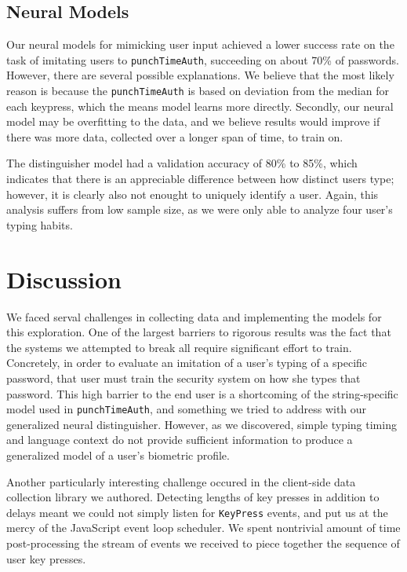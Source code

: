 \documentclass[9pt,journal]{IEEEtran}
\begin{document}
\subsection{Neural Models}

Our neural models for mimicking user input achieved a lower success rate on the task of imitating users to \texttt{punchTimeAuth}, succeeding on about 70\% of passwords. However, there are several possible explanations. We believe that the most likely reason is because the \texttt{punchTimeAuth} is based on deviation from the median for each keypress, which the means model learns more directly. Secondly, our neural model may be overfitting to the data, and we believe results would improve if there was more data, collected over a longer span of time, to train on.

The distinguisher model had a validation accuracy of 80\% to 85\%, which indicates that there is an appreciable difference between how distinct users type; however, it is clearly also not enought to uniquely identify a user. Again, this analysis suffers from low sample size, as we were only able to analyze four user's typing habits.

\section{Discussion}

We faced serval challenges in collecting data and implementing the models for this exploration. One of the largest barriers to rigorous results was the fact that the systems we attempted to break all require significant effort to train. Concretely, in order to evaluate an imitation of a user's typing of a specific password, that user must train the security system on how she types that password. This high barrier to the end user is a shortcoming of the string-specific model used in \texttt{punchTimeAuth}, and something we tried to address with our generalized neural distinguisher. However, as we discovered, simple typing timing and language context do not provide sufficient information to produce a generalized model of a user's biometric profile.

Another particularly interesting challenge occured in the client-side data collection library we authored. Detecting lengths of key presses in addition to delays meant we could not simply listen for \texttt{KeyPress} events, and put us at the mercy of the JavaScript event loop scheduler. We spent nontrivial amount of time post-processing the stream of events we received to piece together the sequence of user key presses.
\end{document}
